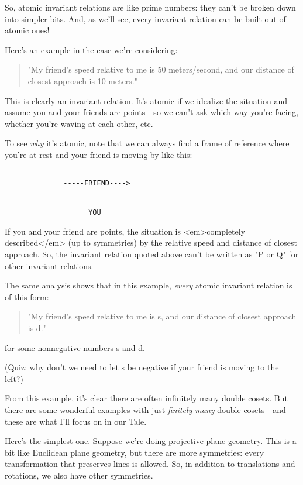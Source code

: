 So, atomic invariant relations are like prime numbers: they can't
be broken down into simpler bits.  And, as we'll see, every invariant
relation can be built out of atomic ones!  

Here's an example in the case we're considering:

\begin{quote}
  "My friend's speed relative to me is 50 meters/second, and our
   distance of closest approach is 10 meters."
\end{quote}

This is clearly an invariant relation.  It's atomic if we idealize 
the situation and assume you and your friends are points - so we 
can't ask which way you're facing, whether you're waving at each other, 
etc.

To see \emph{why} it's atomic, note that we can always find a frame of 
reference where you're at rest and your friend is moving by like this:


\begin{verbatim}

              -----FRIEND---->


                    YOU
\end{verbatim}
    
If you and your friend are points, the situation is <em>completely 
described</em> (up to symmetries) by the relative speed and distance 
of closest approach.  So, the invariant relation quoted above 
can't be written as "P or Q" for other invariant relations.  

The same analysis shows that in this example, \emph{every} atomic invariant 
relation is of this form:

\begin{quote}
  "My friend's speed relative to me is s, and our distance of 
  closest approach is d."
\end{quote}

for some nonnegative numbers s and d.

(Quiz: why don't we need to let s be negative if your friend is moving 
to the left?)

From this example, it's clear there are often infinitely many
double cosets.  But there are some wonderful examples with just 
\emph{finitely many} double cosets - and these are what I'll focus
on in our Tale.

Here's the simplest one.  Suppose we're doing projective plane 
geometry.  This is a bit like Euclidean plane geometry, but there are
more symmetries: every transformation that preserves lines is allowed.
So, in addition to translations and rotations, we also have other 
symmetries.  

